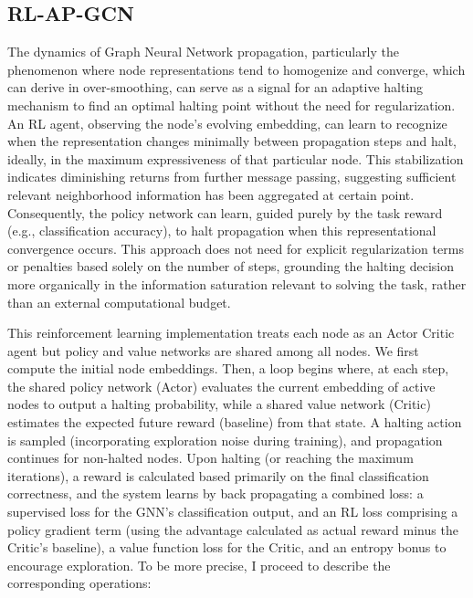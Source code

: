 \documentclass{gdl}
\begin{document}
\subsection{RL-AP-GCN}
The dynamics of Graph Neural Network propagation, particularly the phenomenon where node representations tend to homogenize and converge, which can derive in over-smoothing, can serve as a signal for an adaptive halting mechanism to find an optimal halting point without the need for regularization. An RL agent, observing the node's evolving embedding, can learn to recognize when the representation changes minimally between propagation steps and halt, ideally, in the maximum expressiveness of that particular node. This stabilization indicates diminishing returns from further message passing, suggesting sufficient relevant neighborhood information has been aggregated at certain point. Consequently, the policy network can learn, guided purely by the task reward (e.g., classification accuracy), to halt propagation when this representational convergence occurs. This approach does not need for explicit regularization terms or penalties based solely on the number of steps, grounding the halting decision more organically in the information saturation relevant to solving the task, rather than an external computational budget.

This reinforcement learning implementation treats each node as an Actor Critic agent but policy and value networks are shared among all nodes. We first compute the initial node embeddings. Then, a loop begins where, at each step, the shared policy network (Actor) evaluates the current embedding of active nodes to output a halting probability, while a shared value network (Critic) estimates the expected future reward (baseline) from that state. A halting action is sampled (incorporating exploration noise during training), and propagation continues for non-halted nodes. Upon halting (or reaching the maximum iterations), a reward is calculated based primarily on the final classification correctness, and the system learns by back propagating a combined loss: a supervised loss for the GNN's classification output, and an RL loss comprising a policy gradient term (using the advantage calculated as actual reward minus the Critic's baseline), a value function loss for the Critic, and an entropy bonus to encourage exploration. To be more precise, I proceed to describe the corresponding operations: 
\end{document}
